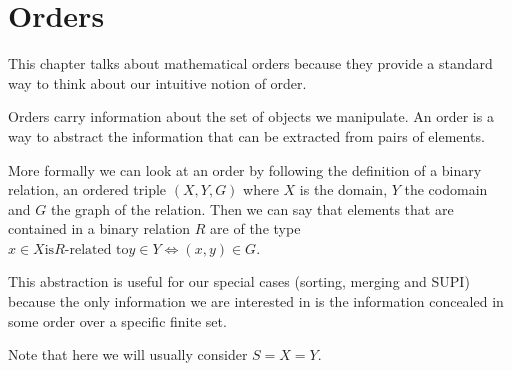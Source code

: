 \section{Orders}

This chapter talks about mathematical orders because they provide a standard way to think about our intuitive notion of order.

Orders carry information about the set of objects we manipulate. An order is a way to abstract the information that can be extracted from pairs of elements.

More formally we can look at an order by following the definition of a binary relation, an ordered triple $(X, Y, G)$ where $X$ is the domain, $Y$ the codomain and $G$ the graph of the relation.
Then we can say that elements that are contained in a binary relation $R$ are of the type $x \in X \text{is} R\text{-related to} y \in Y \iff (x, y) \in G$.

This abstraction is useful for our special cases (sorting, merging and SUPI) because the only information we are interested in is the information concealed in some order over a specific finite set.

Note that here we will usually consider $S = X = Y$.